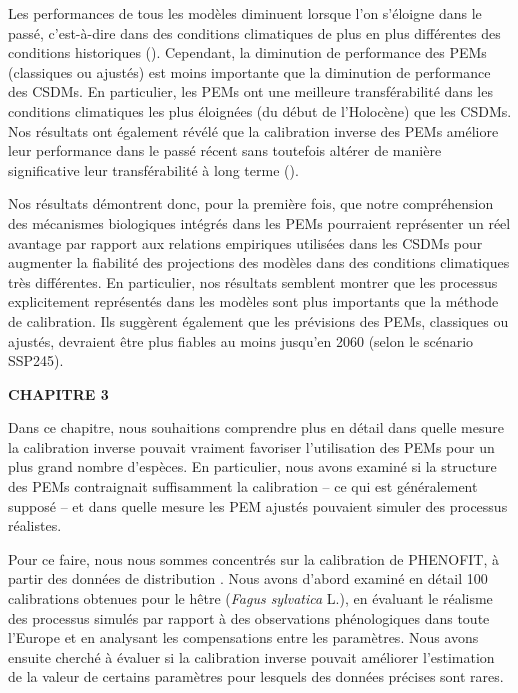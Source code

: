 Les performances de tous les modèles diminuent lorsque l'on s'éloigne dans le passé, c'est-à-dire dans des conditions climatiques de plus en plus différentes des conditions historiques (). Cependant, la diminution de performance des PEMs (classiques ou ajustés) est moins importante que la diminution de performance des CSDMs. En particulier, les PEMs ont une meilleure transférabilité dans les conditions climatiques les plus éloignées (du début de l'Holocène) que les CSDMs. Nos résultats ont également révélé que la calibration inverse des PEMs améliore leur performance dans le passé récent sans toutefois altérer de manière significative leur transférabilité à long terme ().

Nos résultats démontrent donc, pour la première fois, que notre compréhension des mécanismes biologiques intégrés dans les PEMs pourraient représenter un réel avantage par rapport aux relations empiriques utilisées dans les CSDMs pour augmenter la fiabilité des projections des modèles dans des conditions climatiques très différentes. En particulier, nos résultats semblent montrer que les processus explicitement représentés dans les modèles sont plus importants que la méthode de calibration. Ils suggèrent également que les prévisions des PEMs, classiques ou ajustés, devraient être plus fiables au moins jusqu'en 2060 (selon le scénario SSP245).

\vspace*{1cm}
{\noindent\large\bfseries\sffamily CHAPITRE 3}

Dans ce chapitre, nous souhaitions comprendre plus en détail dans quelle mesure la calibration inverse pouvait vraiment favoriser l’utilisation des PEMs pour un plus grand nombre d’espèces. En particulier, nous avons examiné si la structure des PEMs contraignait suffisamment la calibration -- ce qui est généralement supposé \citep{Higgins2020} -- et dans quelle mesure les PEM ajustés pouvaient simuler des processus réalistes. 

Pour ce faire, nous nous sommes concentrés sur la calibration de PHENOFIT, à partir des données de distribution \citep{VanderMeersch2023}. Nous avons d’abord examiné en détail 100 calibrations obtenues pour le hêtre (\emph{Fagus sylvatica} L.), en évaluant le réalisme des processus simulés par rapport à des observations phénologiques dans toute l’Europe et en analysant les compensations entre les paramètres. Nous avons ensuite cherché à évaluer si la calibration inverse pouvait améliorer l’estimation de la valeur de certains paramètres pour lesquels des données précises sont rares.

